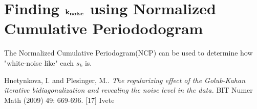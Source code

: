 \documentclass[11pt]{amsart}
\begin{document}
\section{Finding $\bf k_{noise}$ using Normalized Cumulative Periododogram}
The Normalized Cumulative Periodogram(NCP) can be used to determine how 
"white-noise like" each $s_k$ is.

\begin{thebibliography}{1}
    Hnetynkova, I. and Plesinger, M.. 
    \emph{The regularizing effect of the Golub-Kahan iterative bidiagonalization 
      and revealing the noise level in the data.}
      BIT Numer Math (2009) 49: 669-696.
     [17] Ivete
\end{thebibliography}
\end{document}
